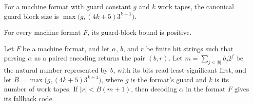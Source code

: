 \begin{definition}
\label{Turing.MachineFormat.canonGuardBlock}
\leanok
{}
For a machine format with guard constant $g$ and $k$ work tapes, the canonical guard
block size is $\max\bigl(g,(4k+5)3^{k+1}\bigr)$.
\end{definition}

\begin{lemma}
\label{Turing.MachineFormat.canonGuardBlock_pos}
\leanok
{}
For every machine format $F$, its guard-block bound is positive.
\end{lemma}

\begin{lemma}
\label{Turing.MachineFormat.decode_of_canonGuard}
\leanok
{}
Let $F$ be a machine format, and let $\alpha$, $b$, and $r$ be finite bit strings such
that parsing $\alpha$ as a paired encoding returns the pair $(b,r)$. Let $m=\sum_{j<|b|}
b_j2^j$ be the natural number represented by $b$, with its bits read least-significant
first, and let $B=\max\bigl(g,(4k+5)3^{k+1}\bigr)$, where $g$ is the format's guard and
$k$ is its number of work tapes. If $|r|<B(m+1)$, then decoding $\alpha$ in the format
$F$ gives its fallback code.
\end{lemma}

